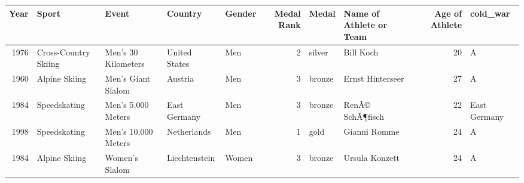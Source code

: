 \documentclass[]{book}
\theoremstyle{definition}
\theoremstyle{definition}
\theoremstyle{definition}
\theoremstyle{remark}
\begin{document}
\begin{tabular}{r|l|l|l|l|r|l|l|r|l}
\hline
Year & Sport & Event & Country & Gender & Medal Rank & Medal & Name of Athlete or Team & Age of Athlete & cold\_war\\
\hline
1976 & Cross-Country Skiing & Men's 30 Kilometers & United States & Men & 2 & silver & Bill Koch & 20 & A\\
\hline
1960 & Alpine Skiing & Men's Giant Slalom & Austria & Men & 3 & bronze & Ernst Hinterseer & 27 & A\\
\hline
1984 & Speedskating & Men's 5,000 Meters & East Germany & Men & 3 & bronze & RenÃ© SchÃ¶fisch & 22 & East Germany\\
\hline
1998 & Speedskating & Men's 10,000 Meters & Netherlands & Men & 1 & gold & Gianni Romme & 24 & A\\
\hline
1984 & Alpine Skiing & Women's Slalom & Liechtenstein & Women & 3 & bronze & Ursula Konzett & 24 & A\\
\hline
\end{tabular}
\end{document}
